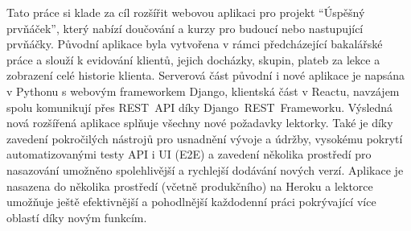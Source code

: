 Tato práce si klade za cíl rozšířit webovou aplikaci pro projekt \enquote{Úspěšný prvňáček}, který nabízí doučování a kurzy pro budoucí nebo nastupující prvňáčky. Původní aplikace byla vytvořena v rámci předcházející bakalářské práce a slouží k evidování klientů, jejich docházky, skupin, plateb za lekce a zobrazení celé historie klienta. Serverová část původní i nové aplikace je napsána v Pythonu s webovým frameworkem Django, klientská část v Reactu, navzájem spolu komunikují přes REST~API díky Django~REST~Frameworku. Výsledná nová rozšířená aplikace splňuje všechny nové požadavky lektorky. Také je díky zavedení pokročilých nástrojů pro usnadnění vývoje a údržby, vysokému pokrytí automatizovanými testy API i UI (E2E) a zavedení několika prostředí pro nasazování umožněno spolehlivější a rychlejší dodávání nových verzí. Aplikace je nasazena do několika prostředí (včetně produkčního) na Heroku a lektorce umožňuje ještě efektivnější a pohodlnější každodenní práci pokrývající více oblastí díky novým funkcím.
